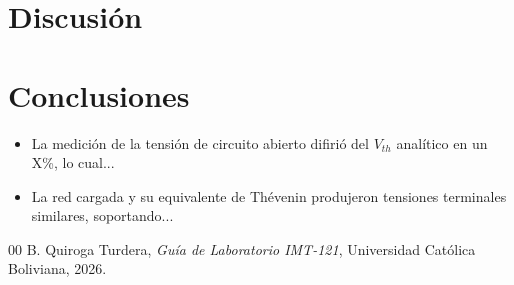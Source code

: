 \documentclass[journal, a4paper]{IEEEtran}
\begin{document}

\section{Discusión}

\section{Conclusiones}
\begin{itemize}
    \item La medición de la tensión de circuito abierto difirió del $V_{th}$ analítico en un X\%, lo cual...
    \item La red cargada y su equivalente de Thévenin produjeron tensiones terminales similares, soportando...
\end{itemize}

\begin{thebibliography}{00}
B. Quiroga Turdera, \emph{Guía de Laboratorio IMT-121}, Universidad Católica Boliviana, 2026.
\end{thebibliography}

\end{document}
